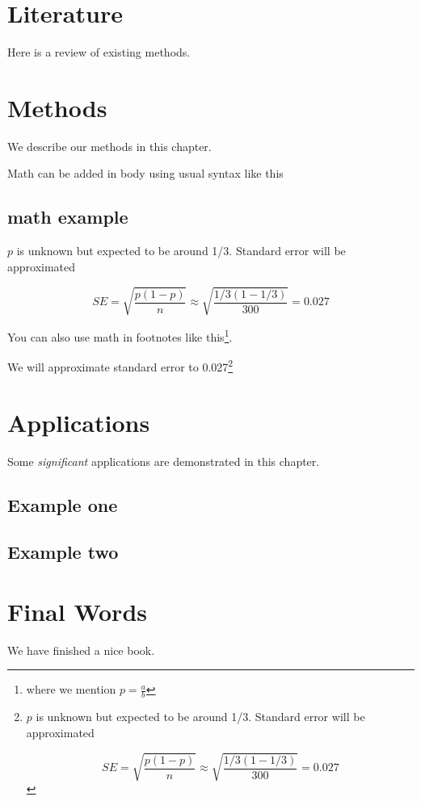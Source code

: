 \documentclass[
]{book}
\begin{document}
\chapter{Literature}\label{literature}

Here is a review of existing methods.

\chapter{Methods}\label{methods}

We describe our methods in this chapter.

Math can be added in body using usual syntax like this

\section{math example}\label{math-example}

\(p\) is unknown but expected to be around 1/3. Standard error will be approximated

\[
SE = \sqrt{\frac{p(1-p)}{n}} \approx \sqrt{\frac{1/3 (1 - 1/3)} {300}} = 0.027
\]

You can also use math in footnotes like this\footnote{where we mention \(p = \frac{a}{b}\)}.

We will approximate standard error to 0.027\footnote{\(p\) is unknown but expected to be around 1/3. Standard error will be approximated

  \[
  SE = \sqrt{\frac{p(1-p)}{n}} \approx \sqrt{\frac{1/3 (1 - 1/3)} {300}} = 0.027
  \]}

\chapter{Applications}\label{applications}

Some \emph{significant} applications are demonstrated in this chapter.

\section{Example one}\label{example-one}

\section{Example two}\label{example-two}

\chapter{Final Words}\label{final-words}

We have finished a nice book.

  
\end{document}
